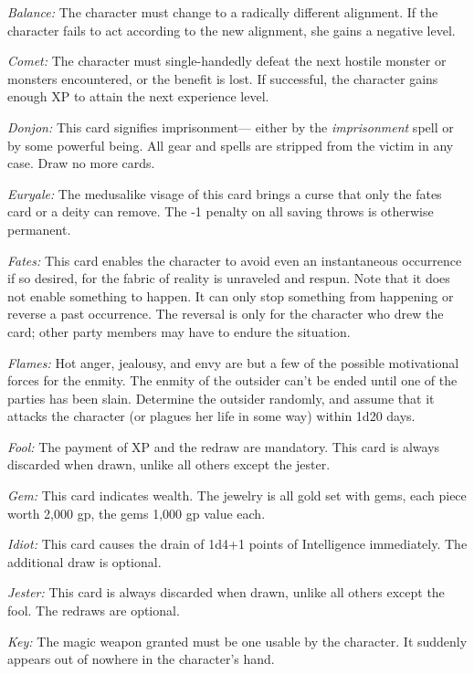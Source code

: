 \documentclass{article}
\begin{document}
\vspace{12pt}
\textit{Balance: }The character must change to a radically different alignment. 
If the character fails to act according to the new alignment, she gains a negative 
level.

\textit{Comet: }The character must single-handedly defeat the next hostile monster 
or monsters encountered, or the benefit is lost. If successful, the character gains 
enough XP to attain the next experience level.

\textit{Donjon: }This card signifies imprisonment--- either by the \textit{imprisonment 
}spell or by some powerful being. All gear and spells are stripped from the victim 
in any case. Draw no more cards.

\textit{Euryale: }The medusalike visage of this card brings a curse that only the 
fates card or a deity can remove. The -1 penalty on all saving throws is otherwise 
permanent.

\textit{Fates: }This card enables the character to avoid even an instantaneous 
occurrence if so desired, for the fabric of reality is unraveled and respun. Note 
that it does not enable something to happen. It can only stop something from happening 
or reverse a past occurrence. The reversal is only for the character who drew the 
card; other party members may have to endure the situation.

\textit{Flames: }Hot anger, jealousy, and envy are but a few of the possible motivational 
forces for the enmity. The enmity of the outsider can't be ended until one of the 
parties has been slain. Determine the outsider randomly, and assume that it attacks 
the character (or plagues her life in some way) within 1d20 days.

\textit{Fool: }The payment of XP and the redraw are mandatory. This card is always 
discarded when drawn, unlike all others except the jester.

\textit{Gem: }This card indicates wealth. The jewelry is all gold set with gems, 
each piece worth 2,000 gp, the gems 1,000 gp value each. 

\textit{Idiot: }This card causes the drain of 1d4+1 points of Intelligence immediately. 
The additional draw is optional.

\textit{Jester: }This card is always discarded when drawn, unlike all others except 
the fool. The redraws are optional.

\textit{Key: }The magic weapon granted must be one usable by the character. It 
suddenly appears out of nowhere in the character's hand.
\end{document}
